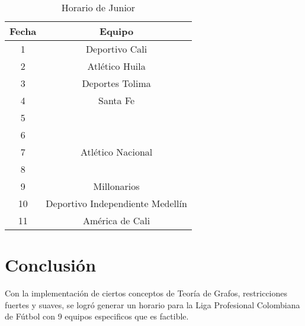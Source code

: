 \documentclass[11pt]{article}
\begin{document}
\begin{multicols}{2}
            \begin{table}[H]
                \centering
                \begin{tabular}{|c||c|}
                    \hline
                    Fecha & Equipo\\ \hline
                    1 & Deportivo Cali\\ \hline
                    2 & Atlético Huila \\ \hline
                    3 & Deportes Tolima  \\ \hline
                    4 & Santa Fe \\ \hline
                    5 &  \\ \hline
                    6 &  \\ \hline
                    7 & Atlético Nacional \\ \hline
                    8 & \\ \hline
                    9 & Millonarios \\ \hline
                    10 & Deportivo Independiente Medellín \\ \hline
                    11 & América de Cali \\ \hline
                \end{tabular} 
                \caption{Horario de Junior}
            \end{table}
                    
            \section{Conclusión}
            Con la implementación de ciertos conceptos de Teoría de Grafos, restricciones fuertes y suaves, se logró generar un horario para la Liga Profesional Colombiana de Fútbol con 9 equipos especificos
            que es factible.
            

\end{multicols}
\end{document}
